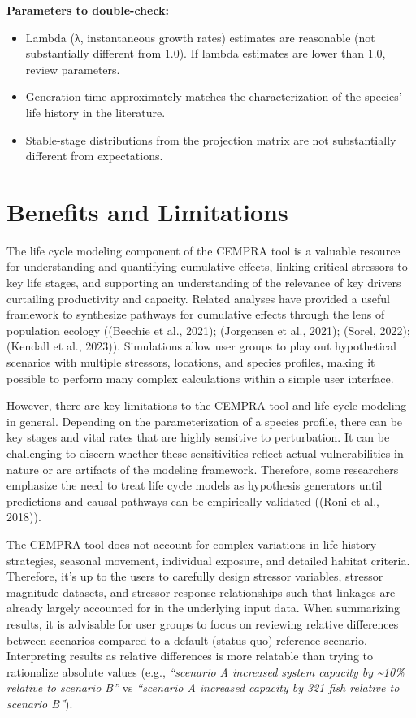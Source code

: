 \documentclass[
  letterpaper,
  DIV=11,
  numbers=noendperiod]{scrreprt}
\providecommand{\tightlist}{%
  \setlength{\itemsep}{0pt}\setlength{\parskip}{0pt}}
\begin{document}
\textbf{Parameters to double-check:}

\begin{itemize}
\tightlist
\item
  Lambda (λ, instantaneous growth rates) estimates are reasonable (not
  substantially different from 1.0). If lambda estimates are lower than
  1.0, review parameters.
\item
  Generation time approximately matches the characterization of the
  species' life history in the literature.
\item
  Stable-stage distributions from the projection matrix are not
  substantially different from expectations.
\end{itemize}

\section{Benefits and Limitations}\label{benefits-and-limitations}

The life cycle modeling component of the CEMPRA tool is a valuable
resource for understanding and quantifying cumulative effects, linking
critical stressors to key life stages, and supporting an understanding
of the relevance of key drivers curtailing productivity and capacity.
Related analyses have provided a useful framework to synthesize pathways
for cumulative effects through the lens of population ecology ((Beechie
et al., 2021); (Jorgensen et al., 2021); (Sorel, 2022); (Kendall et al.,
2023)). Simulations allow user groups to play out hypothetical scenarios
with multiple stressors, locations, and species profiles, making it
possible to perform many complex calculations within a simple user
interface.

However, there are key limitations to the CEMPRA tool and life cycle
modeling in general. Depending on the parameterization of a species
profile, there can be key stages and vital rates that are highly
sensitive to perturbation. It can be challenging to discern whether
these sensitivities reflect actual vulnerabilities in nature or are
artifacts of the modeling framework. Therefore, some researchers
emphasize the need to treat life cycle models as hypothesis generators
until predictions and causal pathways can be empirically validated
((Roni et al., 2018)).

The CEMPRA tool does not account for complex variations in life history
strategies, seasonal movement, individual exposure, and detailed habitat
criteria. Therefore, it's up to the users to carefully design stressor
variables, stressor magnitude datasets, and stressor-response
relationships such that linkages are already largely accounted for in
the underlying input data. When summarizing results, it is advisable for
user groups to focus on reviewing relative differences between scenarios
compared to a default (status-quo) reference scenario. Interpreting
results as relative differences is more relatable than trying to
rationalize absolute values (e.g., \emph{``scenario A increased system
capacity by \textasciitilde10\% relative to scenario B''} vs
\emph{``scenario A increased capacity by 321 fish relative to scenario
B''}).
\end{document}
